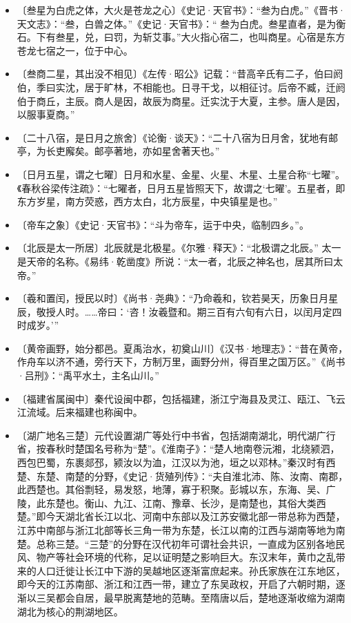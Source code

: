 \documentclass[12pt,UTF-8,openany]{ctexbook}
\begin{document}
\begin{itemize}
    \setlength\itemsep{-0.2em}
    \item〔叁星为白虎之体，大火是苍龙之心〕《史记·天官书》：“叁为白虎。”《晋书·天文志》：“叁，白兽之体。”《史记·天官书》：“ 叁为白虎。叁星直者，是为衡石。下有叁星，兑，曰罚，为斩艾事。”大火指心宿二，也叫商星。心宿是东方苍龙七宿之一，位于中心。
    \item〔叁商二星，其出没不相见〕《左传·昭公》记载：“昔高辛氏有二子，伯曰阏伯，季曰实沈，居于旷林，不相能也。日寻干戈，以相征讨。后帝不臧，迁阏伯于商丘，主辰。商人是因，故辰为商星。迁实沈于大夏，主参。唐人是因，以服事夏商。”
    \item〔二十八宿，是日月之旅舍〕《论衡·谈天》：“二十八宿为日月舍，犹地有邮亭，为长吏廨矣。邮亭著地，亦如星舍著天也。”
    \item〔日月五星，谓之七曜〕日月和水星、金星、火星、木星、土星合称“七曜”。《春秋谷梁传注疏》：“七曜者，日月五星皆照天下，故谓之‘七曜’。五星者，即东方岁星，南方荧惑，西方太白，北方辰星，中央镇星是也。”
    \item〔帝车之象〕《史记·天官书》：“斗为帝车，运于中央，临制四乡。”。
    \item〔北辰是太一所居〕北辰就是北极星。《尔雅·释天》：“北极谓之北辰。” 太一是天帝的名称。《易纬·乾凿度》所说：“太一者，北辰之神名也，居其所曰太帝。”
    \item〔羲和置闰，授民以时〕《尚书·尧典》：“乃命羲和，钦若昊天，历象日月星辰，敬授人时。……帝曰：‘咨！汝羲暨和。期三百有六旬有六日，以闰月定四时成岁。’”
    \item〔黄帝画野，始分都邑。夏禹治水，初奠山川〕《汉书·地理志》：“昔在黄帝，作舟车以济不通，旁行天下，方制万里，画野分州，得百里之国万区。”《尚书·吕刑》：“禹平水土，主名山川。”
    \item〔福建省属闽中〕秦代设闽中郡，包括福建，浙江宁海县及灵江、瓯江、飞云江流域。后来福建也称闽中。
    \item〔湖广地名三楚〕元代设置湖广等处行中书省，包括湖南湖北，明代湖广行省，按春秋时楚国名号称为“楚”。《淮南子》：“楚人地南卷沅湘，北绕颍泗，西包巴蜀，东裹郯邳，颍汝以为洫，江汉以为池，垣之以邓林。”秦汉时有西楚、东楚、南楚的分野，《史记·货殖列传》：“夫自淮北沛、陈、汝南、南郡，此西楚也。其俗剽轻，易发怒，地薄，寡于积聚。彭城以东，东海、吴、广陵，此东楚也。衡山、九江、江南、豫章、长沙，是南楚也，其俗大类西楚。”即今天湖北省长江以北、河南中东部以及江苏安徽北部一带总称为西楚，江苏中南部与浙江北部等长三角一带为东楚，长江以南的江西与湖南等地为南楚。总称三楚。“三楚”的分野在汉代初年可谓社会共识，一直成为区别各地民风、物产等社会环境的代称，足以证明楚之影响巨大。东汉末年，黄巾之乱带来的人口迁徙让长江中下游的吴越地区逐渐富庶起来。孙氏家族在江东地区，即今天的江苏南部、浙江和江西一带，建立了东吴政权，开启了六朝时期，逐渐以三吴都会自居，最早脱离楚地的范畴。至隋唐以后，楚地逐渐收缩为湖南湖北为核心的荆湖地区。

\end{itemize}
\end{document}
